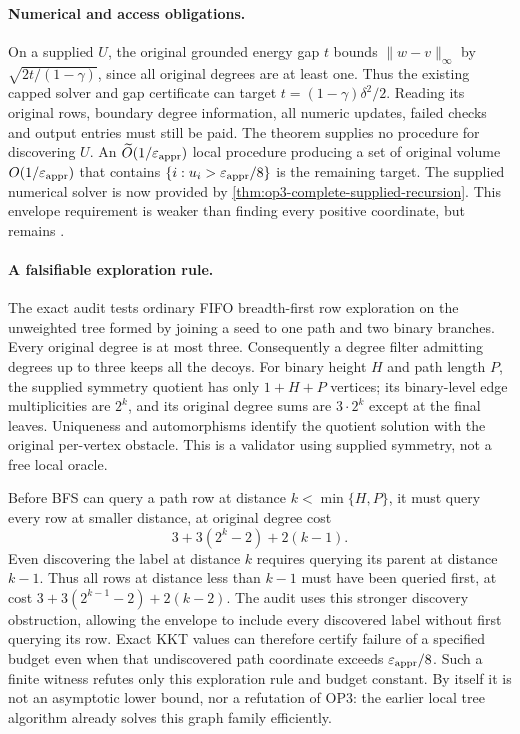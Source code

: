 \paragraph{Numerical and access obligations.}
On a supplied $U$, the original grounded energy gap $t$ bounds
$\|w-v\|_\infty$ by $\sqrt{2t/(1-\gamma)}$, since all original
degrees are at least one. Thus the existing capped solver and gap
certificate can target $t=(1-\gamma)\delta^2/2$.
Reading its original rows, boundary degree information, all numeric
updates, failed checks and output entries must still be paid. The
theorem supplies no procedure for discovering $U$.
An $\widetilde O(1/\varepsilon_{\mathrm{appr}})$ local procedure producing a set of
original volume $O(1/\varepsilon_{\mathrm{appr}})$ that contains
$\{i:u_i>\varepsilon_{\mathrm{appr}}/8\}$ is the remaining target. The supplied numerical
solver is now provided by \cref{thm:op3-complete-supplied-recursion}.
This envelope requirement is weaker than
finding every positive coordinate, but remains \statusopen.

\paragraph{A falsifiable exploration rule.}
The exact audit tests ordinary FIFO breadth-first row exploration on
the unweighted tree formed by joining a seed to one path and two binary
branches. Every original degree is at most three. Consequently a
degree filter admitting degrees up to three keeps all the decoys.
For binary height $H$ and path length $P$, the supplied symmetry
quotient has only $1+H+P$ vertices; its binary-level edge multiplicities
are $2^k$, and its original degree sums are $3\cdot2^k$ except
at the final leaves. Uniqueness and automorphisms identify the quotient
solution with the original per-vertex obstacle. This is a validator
using supplied symmetry, not a free local oracle.

Before BFS can query a path row at distance $k<\min\{H,P\}$,
it must query every row at smaller distance, at original degree cost
\[
 3+3(2^k-2)+2(k-1).
\]
Even discovering the label at distance $k$ requires querying its parent
at distance $k-1$. Thus all rows at distance less than $k-1$ must have
been queried first, at cost $3+3(2^{k-1}-2)+2(k-2)$.
The audit uses this stronger discovery obstruction, allowing the envelope
to include every discovered label without first querying its row.
Exact KKT values can therefore certify failure of a specified budget
even when that undiscovered path coordinate exceeds $\varepsilon_{\mathrm{appr}}/8$. Such a finite
witness refutes only this exploration rule and budget constant. By itself it is
not an asymptotic lower bound, nor a refutation of OP3: the earlier
local tree algorithm already solves this graph family efficiently.

